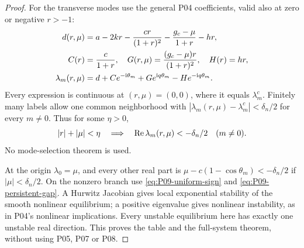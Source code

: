 \begin{proof}
For the transverse modes use the general P04 coefficients, valid also
at zero or negative $r>-1$:
\begin{align}
 d(r,\mu)&=a-2kr-\frac{cr}{(1+r)^2}-\frac{g_c-\mu}{1+r}-hr,
 \notag\\
 C(r)&=\frac c{1+r},\quad G(r,\mu)=\frac{(g_c-\mu)r}{(1+r)^2},
 \quad H(r)=hr,\notag\\
 \lambda_m(r,\mu)&=d+Ce^{-\mathrm{i}\theta_m}+Ge^{\mathrm{i} q\theta_m}
                                      -He^{-\mathrm{i} q\theta_m}.
 \label{eq:P09-continuous-spectrum}
\end{align}
Every expression is continuous at $(r,\mu)=(0,0)$, where it equals
$\lambda_m^c$. Finitely many labels allow one common neighborhood
with $|\lambda_m(r,\mu)-\lambda_m^c|<\delta_n/2$ for every $m\ne0$.
Thus for some $\eta>0$,
\begin{equation}
 |r|+|\mu|<\eta\quad\Longrightarrow\quad
 \operatorname{Re}\lambda_m(r,\mu)<-\delta_n/2\quad(m\ne0).
 \label{eq:P09-persistent-gap}
\end{equation}
No mode-selection theorem is used.

At the origin $\lambda_0=\mu$, and every other real part is
$\mu-c(1-\cos\theta_m)<-\delta_n/2$ if $|\mu|<\delta_n/2$.
On the nonzero branch use \eqref{eq:P09-uniform-sign} and
\eqref{eq:P09-persistent-gap}. A Hurwitz Jacobian gives local exponential
stability of the smooth nonlinear equilibrium; a positive eigenvalue
gives nonlinear instability, as in P04's nonlinear implications.
Every unstable equilibrium here has exactly one unstable real direction.
This proves the table and the full-system theorem, without using P05,
P07 or P08.
\end{proof}

